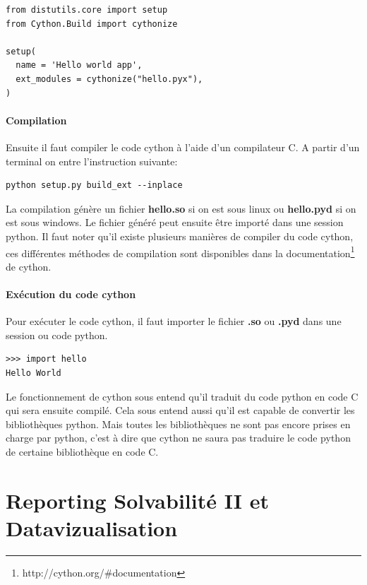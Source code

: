 \begin{verbatim}
from distutils.core import setup
from Cython.Build import cythonize

setup(
  name = 'Hello world app',
  ext_modules = cythonize("hello.pyx"),
)
\end{verbatim}

\subsubsection{Compilation}
Ensuite il faut compiler le code cython à l'aide d'un compilateur C. A partir d'un terminal on entre l'instruction suivante:

\begin{verbatim}
python setup.py build_ext --inplace
\end{verbatim}

La compilation génère un fichier \textbf{hello.so} si on est sous linux ou \textbf{hello.pyd} si on est sous windows. Le fichier généré peut ensuite être importé dans une session python.
Il faut noter qu'il existe plusieurs manières de compiler du code cython, ces différentes méthodes de compilation sont disponibles dans la documentation\footnote{http://cython.org/\#documentation} de cython.

\subsubsection{Exécution du code cython}
Pour exécuter le code cython, il faut importer le fichier \textbf{.so} ou \textbf{.pyd} dans une session ou code python.
\begin{verbatim}
>>> import hello
Hello World
\end{verbatim}

Le fonctionnement de cython sous entend qu'il traduit du code python en code C qui sera ensuite compilé. Cela sous entend aussi qu'il est capable de convertir les bibliothèques python. Mais toutes les bibliothèques ne sont pas encore prises en charge par python, c'est à dire que cython ne saura pas traduire le code python de certaine bibliothèque en code C.


\chapter{Reporting Solvabilité II et Datavizualisation}

